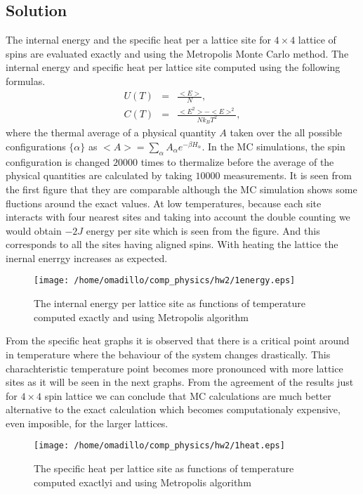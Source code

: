 \documentclass[a4paper,prb,8pt]{revtex4-1}
\begin{document}
\subsection*{Solution}
The internal energy and the specific heat per a lattice site  for $4\times4$ lattice of spins are evaluated exactly and using the Metropolis Monte Carlo method. The internal energy and specific heat per lattice site computed using the following formulas.
\begin{eqnarray}
U(T) &=& \frac{<E>}{N},\\
C(T) &=& \frac{<E^2>-<E>^2}{Nk_B T^2},
\end{eqnarray}
where the thermal average of a  physical quantity $A$ taken over the all possible configurations $\{\alpha\}$ as $<A>  = \sum_{\alpha}A_{\alpha}e^{-\beta H_{\alpha}}$.
In the MC simulations, the spin configuration is changed $20000$ times to thermalize before the average of the physical quantities are calculated by taking $10000$ measurements. It is seen from the first figure that they are comparable although the MC simulation shows some fluctions around the exact values. At low temperatures, because each site interacts with four nearest sites and taking into account the double counting we would obtain $-2J$ energy per site which is seen from the figure. And this corresponds to all the sites having aligned spins. With heating the lattice the inernal enerrgy increases as expected.
\begin{figure}[H]
\begin{center}
\texttt{[image: /home/omadillo/comp\_physics/hw2/1energy.eps]}
\caption{The internal energy per lattice site as functions of temperature computed exactly and using Metropolis algorithm}
\label{fig1}
\end{center}
\end{figure}
From the specific heat graphs it is observed that there is a critical point around in temperature where the behaviour of the system changes drastically. This charachteristic temperature point becomes more pronounced with more lattice sites as it will be seen in the next graphs. From the agreement of the results just for $4\times4$ spin lattice we can conclude that MC calculations are much better alternative to the exact calculation which becomes computationaly expensive, even imposible, for the larger lattices. 

\begin{figure}[H]
\begin{center}
\texttt{[image: /home/omadillo/comp\_physics/hw2/1heat.eps]}
\caption{The specific heat per lattice site as functions of temperature computed exactlyi and using Metropolis algorithm}
\label{fig2}
\end{center}
\end{figure}
\end{document}
